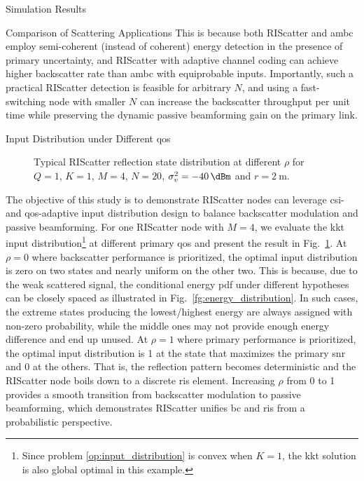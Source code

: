 \documentclass[journal]{IEEEtran}
\begin{document}
\begin{section}{Simulation Results}
\begin{subsection}{Comparison of Scattering Applications}
		This is because both RIScatter and \gls{ambc} employ semi-coherent (instead of coherent) energy detection in the presence of primary uncertainty, and RIScatter with adaptive channel coding can achieve higher backscatter rate than \gls{ambc} with equiprobable inputs.
		Importantly, such a practical RIScatter detection is feasible for arbitrary $N$, and using a fast-switching node with smaller $N$ can increase the backscatter throughput per unit time while preserving the dynamic passive beamforming gain on the primary link.
	\end{subsection}

	\begin{subsection}{Input Distribution under Different \gls{qos}}
		\begin{figure}[!t]
			\centering
			\resizebox{0.65\columnwidth}{!}{
				
			}
			\caption{Typical RIScatter reflection state distribution at different $\rho$ for $Q=1$, $K=1$, $M=4$, $N=20$, $\sigma_v^2=\qty{-40}{\dBm}$ and $r=\qty{2}{\meter}$.}
			\label{fg:distribution_weights}
		\end{figure}
		The objective of this study is to demonstrate RIScatter nodes can leverage \gls{csi}- and \gls{qos}-adaptive input distribution design to balance backscatter modulation and passive beamforming.
		For one RIScatter node with $M=4$, we evaluate the \gls{kkt} input distribution\footnote{Since problem \eqref{op:input_distribution} is convex when $K=1$, the \gls{kkt} solution is also global optimal in this example.} at different primary \gls{qos} and present the result in Fig.~\ref{fg:distribution_weights}.
		At $\rho=0$ where backscatter performance is prioritized, the optimal input distribution is zero on two states and nearly uniform on the other two.
		This is because, due to the weak scattered signal, the conditional energy \gls{pdf} under different hypotheses can be closely spaced as illustrated in Fig.~\ref{fg:energy_distribution}.
		In such cases, the extreme states producing the lowest/highest energy are always assigned with non-zero probability, while the middle ones may not provide enough energy difference and end up unused.
		At $\rho=1$ where primary performance is prioritized, the optimal input distribution is \num{1} at the state that maximizes the primary \gls{snr} and \num{0} at the others.
		That is, the reflection pattern becomes deterministic and the RIScatter node boils down to a discrete \gls{ris} element.
		Increasing $\rho$ from \num{0} to \num{1} provides a smooth transition from backscatter modulation to passive beamforming, which demonstrates RIScatter unifies \gls{bc} and \gls{ris} from a probabilistic perspective.
	\end{subsection}


\end{section}
\end{document}
